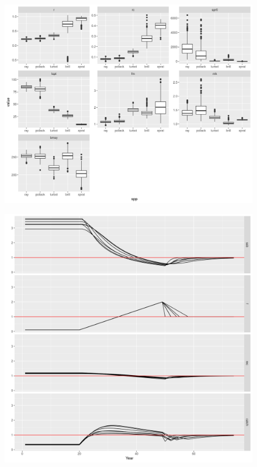 \documentclass[preprint,12pt]{elsarticle}
\begin{document}
\begin{figure}[]\centering\includegraphics[width=5in]{rg-derived-1.png}\caption{}\label{fig:lh}\end{figure}
\begin{figure}[]\centering\includegraphics[width=5in]{rg-ts-1.png}\caption{}\label{fig:ts}\end{figure}
\end{document}
